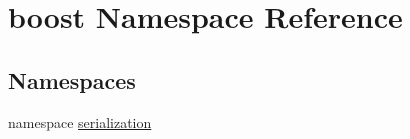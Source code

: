 \hypertarget{namespaceboost}{\section{boost Namespace Reference}
\label{namespaceboost}
}
\subsection*{Namespaces}
\begin{DoxyCompactItemize}
\item 
namespace \hyperlink{namespaceboost_1_1serialization}{serialization}
\end{DoxyCompactItemize}
